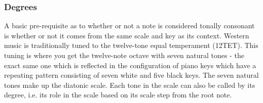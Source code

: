 \subsubsection{Degrees}

A basic pre-requisite as to whether or not a note is considered tonally consonant is whether or
not it comes from the same scale and key as its context. Western music is traditionally tuned to
the twelve-tone equal temperament (12TET). This tuning is where you get the twelve-note octave
with seven natural tones - the exact same one which is reflected in the configuration of piano keys
which have a repeating pattern consisting of seven white and five black keys. The seven natural
tones make up the diatonic scale. Each tone in the scale can also be called by its degree, i.e.
its role in the scale based on its scale step from the root note.

